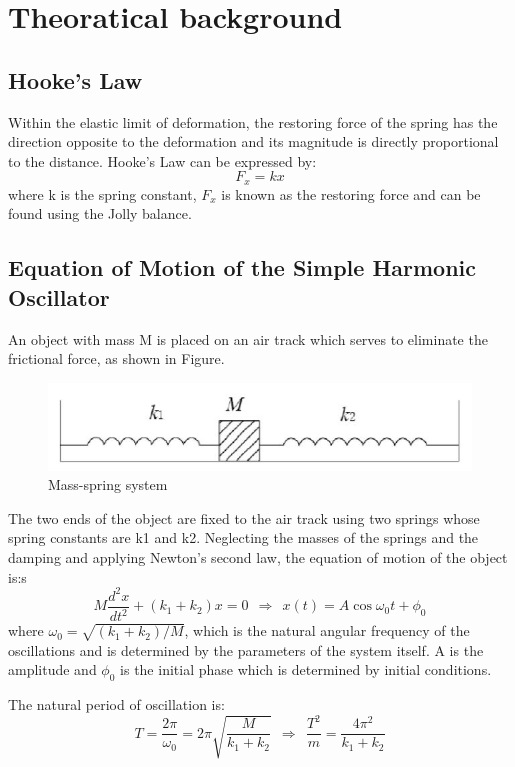 \documentclass[12pt,a4paper]{article}
\begin{document}
\section{Theoratical background}
\subsection{Hooke's Law}
Within the elastic limit of deformation, the restoring force of the spring has the direction opposite to the deformation and its magnitude is directly proportional to the distance. Hooke’s Law can be expressed by:
\begin{equation}
    F_x=kx
\end{equation}
where k is the spring constant, $F_x$ is known as the restoring force and can be found using the Jolly balance.
\subsection{Equation of Motion of the Simple Harmonic Oscillator}
An object with mass M is placed on an air track which serves to eliminate the frictional force, as shown in Figure. 
\begin{figure}[H]
    \centering
        \includegraphics[width=13cm]{figure1.png}
        \caption{Mass-spring system}
\end{figure}
The two ends of the object are fixed to the air track using two springs whose spring constants are k1 and k2. Neglecting the masses of the springs and the damping and applying Newton’s second law, the equation of motion of the object is:s
\begin{equation}
    M\frac{d^2x}{dt^2}+(k_1+k_2)x=0\ \ \Rightarrow\ \ x(t)=A\cos{\omega_0t+\phi_0}
\end{equation}
where $\omega_0=\sqrt{(k_1+k_2)/M}$, which is the natural angular frequency of the oscillations and is determined by the parameters of the system itself. A is the amplitude and $\phi_0$ is the initial phase which is determined by initial conditions.\par 
The natural period of oscillation is:
\begin{equation}
    T=\frac{2\pi}{\omega_0}=2\pi\sqrt{\frac{M}{k_1+k_2}}\ \ \Rightarrow\ \     \frac{T^2}{m}=\frac{4\pi^2}{k_1+k_2}
\end{equation}
\end{document}
